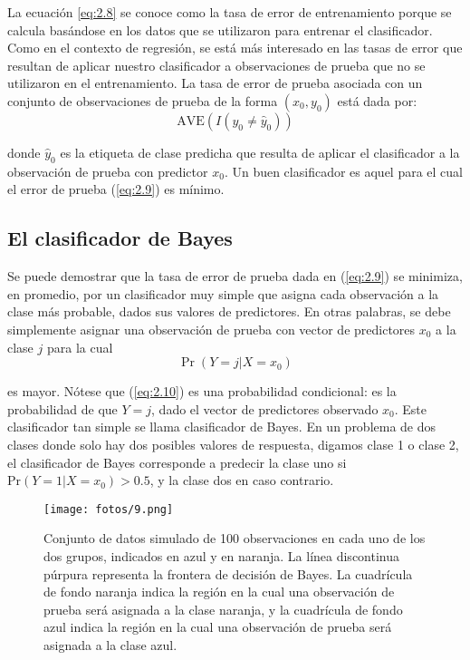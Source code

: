 La ecuación \ref{eq:2.8} se conoce como la tasa de error de entrenamiento porque se calcula basándose en los datos que se utilizaron para entrenar el clasificador. Como en el contexto de regresión, se está más interesado en las tasas de error que resultan de aplicar nuestro clasificador a observaciones de prueba que no se utilizaron en el entrenamiento. La tasa de error de prueba asociada con un conjunto de observaciones de prueba de la forma $(x_0,y_0)$ está dada por:
\begin{equation}
\text{AVE}(I(y_0 \neq \hat{y}_0))
\label{eq:2.9}
\end{equation}

\noindent donde $\hat{y}_0$ es la etiqueta de clase predicha que resulta de aplicar el clasificador a la observación de prueba con predictor $x_0$. Un buen clasificador es aquel para el cual el error de prueba (\ref{eq:2.9}) es mínimo. \\

\subsection{El clasificador de Bayes}

Se puede demostrar que la tasa de error de prueba dada en (\ref{eq:2.9}) se minimiza, en promedio, por un clasificador muy simple que asigna cada observación a la clase más probable, dados sus valores de predictores. En otras palabras, se debe simplemente asignar una observación de prueba con vector de predictores $x_0$ a la clase $j$ para la cual 
\begin{equation}
\Pr(Y = j | X = x_0)
\label{eq:2.10}
\end{equation}

\noindent es mayor. Nótese que (\ref{eq:2.10}) es una probabilidad condicional: es la probabilidad de que $Y = j$, dado el vector de predictores observado $x_0$. Este clasificador tan simple se llama clasificador de Bayes. En un problema de dos clases donde solo hay dos posibles valores de respuesta, digamos clase 1 o clase 2, el clasificador de Bayes corresponde a predecir la clase uno si $\text{Pr}(Y = 1 | X = x_0) > 0.5$, y la clase dos en caso contrario. \\

\begin{figure}[h]
\centering
\texttt{[image: fotos/9.png]}
\caption{Conjunto de datos simulado de 100 observaciones en cada uno de los dos grupos, indicados en azul y en naranja. La línea discontinua púrpura representa la frontera de decisión de Bayes. La cuadrícula de fondo naranja indica la región en la cual una observación de prueba será asignada a la clase naranja, y la cuadrícula de fondo azul indica la región en la cual una observación de prueba será asignada a la clase azul.}
\label{fig:2.13}
\end{figure}

